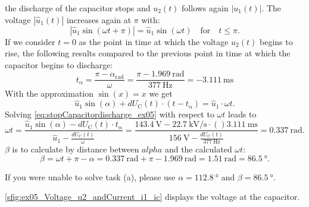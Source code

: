 \begin{solutionblock}
    the discharge of the capacitor stops and $u_\mathrm{2}(t)$ follows again $\left| u_\mathrm{1}(t) \right|$.
    The voltage $\left| \hat{u}_\mathrm{1}(t) \right|$ increases again at $\pi$ with:
    \begin{equation}
        \left| \hat{u}_\mathrm{1}\sin(\omega t + \pi ) \right| = \hat{u}_\mathrm{1}\sin(\omega t) \quad \text{for} \quad t \leq \pi.
    \end{equation}
    If we consider $t=0$ as the point in time at which the voltage $u_\mathrm{2}(t)$ begins to rise, the following 
    results compared to the previous point in time at which the capacitor begins to discharge:      
    \begin{equation}
        t_\mathrm{\alpha}=\frac{\pi - \alpha_\mathrm{rad}}{\omega} = 
        \frac{\pi - \SI{1.969}{\radian}}{\SI{377}{\hertz}} = \SI{-3.111}{\milli\second}
    \end{equation}   
    With the approximation $\sin(x) = x$ we get
    \begin{equation}
        \hat{u}_\mathrm{1}\sin(\alpha) + dU_\mathrm{C}(t) \cdot (t-t_\mathrm{\alpha}) = \hat{u}_\mathrm{1}\cdot \omega t.
        \label{eq:stopCapacitordischarge_ex05}
    \end{equation}   
    Solving \eqref{eq:stopCapacitordischarge_ex05} with respect to $\omega t$ leads to
    \begin{equation}
        \omega t = \frac{\hat{u}_\mathrm{1}\sin(\alpha) - dU_\mathrm{C}(t) \cdot t_\mathrm{\alpha}}
                   {\hat{u}_\mathrm{1}-\frac{dU_\mathrm{C}(t)}{\omega}}=
                   \frac{\SI{143.4}{\volt} - \SI{22.7}{\kilo\volt/\second} \cdot ()\SI{3.111}{\milli\second}}
                   {\SI{156}{\volt}-\frac{dU_\mathrm{C}(t)}{\SI{377}{\hertz}}}=\SI{0.337}{\radian}.
    \end{equation}
    $\beta$ is to calculate by distance between $alpha$ and the calculated $\omega t$:
    \begin{equation}
        \beta=\omega t + \pi - \alpha = \SI{0.337}{\radian} + \pi - \SI{1.969}{\radian}
        = \SI{1.51}{\radian} = \SI{86.5}{\degree}.
    \end{equation}
\end{solutionblock}

\vspace{2em}\par
If you were unable to solve task (a), please use $\alpha=\SI{112.8}{\degree}$ and $\beta=\SI{86.5}{\degree}$.

\begin{solutionblock}
    \autoref{sfig:ex05_Voltage_u2_andCurrent_i1_ic} displays the voltage at the capacitor.
      
\end{solutionblock}

